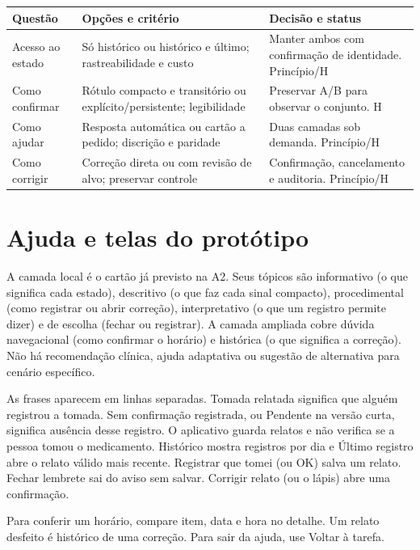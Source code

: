 \begin{center}\small
\begin{tabularx}{\columnwidth}{@{}P{.20\columnwidth}YY@{}}\toprule
Questão & Opções e critério & Decisão e status\\\midrule
Acesso ao estado & Só histórico ou histórico e último; rastreabilidade e custo & Manter ambos com confirmação de identidade. Princípio/H\\
Como confirmar & Rótulo compacto e transitório ou explícito/persistente; legibilidade & Preservar A/B para observar o conjunto. H\\
Como ajudar & Resposta automática ou cartão a pedido; discrição e paridade & Duas camadas sob demanda. Princípio/H\\
Como corrigir & Correção direta ou com revisão de alvo; preservar controle & Confirmação, cancelamento e auditoria. Princípio/H\\\bottomrule
\end{tabularx}
\end{center}

\section{Ajuda e telas do protótipo}\label{ap:ajuda}
A camada local é o cartão já previsto na A2. Seus tópicos são informativo (o que significa cada estado), descritivo (o que faz cada sinal compacto), procedimental (como registrar ou abrir correção), interpretativo (o que um registro permite dizer) e de escolha (fechar ou registrar). A camada ampliada cobre dúvida navegacional (como confirmar o horário) e histórica (o que significa a correção). Não há recomendação clínica, ajuda adaptativa ou sugestão de alternativa para cenário específico.

 As frases aparecem em linhas separadas. Tomada relatada significa que alguém registrou a tomada. Sem confirmação registrada, ou Pendente na versão curta, significa ausência desse registro. O aplicativo guarda relatos e não verifica se a pessoa tomou o medicamento. Histórico mostra registros por dia e Último registro abre o relato válido mais recente. Registrar que tomei (ou OK) salva um relato. Fechar lembrete sai do aviso sem salvar. Corrigir relato (ou o lápis) abre uma confirmação.

 Para conferir um horário, compare item, data e hora no detalhe. Um relato desfeito é histórico de uma correção. Para sair da ajuda, use Voltar à tarefa.

